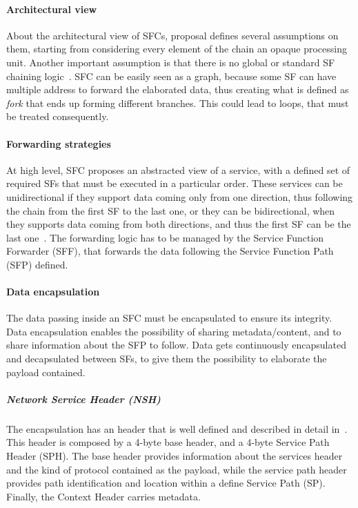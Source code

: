 \paragraph*{Architectural view}
About the architectural view of SFCs, proposal defines several assumptions on
them, starting from considering every element of the chain an opaque processing
unit. Another important assumption is that there is no global or standard SF
chaining logic~\cite{rfc7665}. SFC can be easily seen as a graph, because some
SF can have multiple address to forward the elaborated data, thus creating what
is defined as \emph{fork} that ends up forming different branches. This could
lead to loops, that must be treated consequently.

\paragraph*{Forwarding strategies}
At high level, SFC proposes an abstracted view of a service, with a defined set
of required SFs that must be executed in a particular order. These services can
be unidirectional if they support data coming only from one direction, thus
following the chain from the first SF to the last one, or they can be
bidirectional, when they supports data coming from both directions, and thus the
first SF can be the last one~\cite{rfc7665}. The forwarding logic has to be
managed by the Service Function Forwarder (SFF), that forwards the data
following the Service Function Path (SFP) defined.

\paragraph*{Data encapsulation}
The data passing inside an SFC must be encapsulated to ensure its integrity.
Data encapsulation enables the possibility of sharing metadata/content, and to
share information about the SFP to follow. Data gets continuously encapsulated
and decapsulated between SFs, to give them the possibility to elaborate the
payload contained.

\subparagraph*{Network Service Header (NSH)}
The encapsulation has an header that is well defined and described in detail
in~\cite{rfc8300}. This header is composed by a 4-byte base header, and a 4-byte
Service Path Header (SPH). The base header provides information about the services
header and the kind of protocol contained as the payload, while the service path
header provides path identification and location within a define Service Path
(SP). Finally, the Context Header carries metadata.

